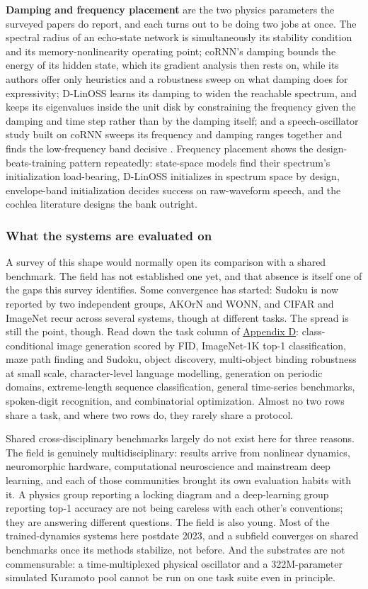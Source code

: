 \documentclass[a4paper,fleqn]{cas-sc}
\begin{document}
\textbf{Damping and frequency placement} are the two physics parameters
the surveyed papers do report, and each turns out to be doing two jobs
at once. The spectral radius of an echo-state network is simultaneously
its stability condition and its memory-nonlinearity operating point;
coRNN's damping bounds the energy of its hidden state, which its
gradient analysis then rests on, while its authors offer only heuristics
and a robustness sweep on what damping does for expressivity; D-LinOSS
learns its damping to widen the reachable spectrum, and keeps its
eigenvalues inside the unit disk by constraining the frequency given the
damping and time step rather than by the damping itself; and a
speech-oscillator study built on coRNN sweeps its frequency and damping
ranges together and finds the low-frequency band decisive
\citep{chandravadia2026}. Frequency placement shows the
design-beats-training pattern repeatedly: state-space models find their
spectrum's initialization load-bearing, D-LinOSS initializes in spectrum
space by design, envelope-band initialization decides success on
raw-waveform speech, and the cochlea literature designs the bank
outright.

\subsubsection{What the systems are evaluated on}\label{sec-2-3-2}

A survey of this shape would normally open its comparison with a shared
benchmark. The field has not established one yet, and that absence is
itself one of the gaps this survey identifies. Some convergence has
started: Sudoku is now reported by two independent groups, AKOrN and
WONN, and CIFAR and ImageNet recur across several systems, though at
different tasks. The spread is still the point, though. Read down the
task column of \hyperref[sec-D]{Appendix D}: class-conditional image
generation scored by FID, ImageNet-1K top-1 classification, maze path
finding and Sudoku, object discovery, multi-object binding robustness at
small scale, character-level language modelling, generation on periodic
domains, extreme-length sequence classification, general time-series
benchmarks, spoken-digit recognition, and combinatorial optimization.
Almost no two rows share a task, and where two rows do, they rarely
share a protocol.

Shared cross-disciplinary benchmarks largely do not exist here for three
reasons. The field is genuinely multidisciplinary: results arrive from
nonlinear dynamics, neuromorphic hardware, computational neuroscience
and mainstream deep learning, and each of those communities brought its
own evaluation habits with it. A physics group reporting a locking
diagram and a deep-learning group reporting top-1 accuracy are not being
careless with each other's conventions; they are answering different
questions. The field is also young. Most of the trained-dynamics systems
here postdate 2023, and a subfield converges on shared benchmarks once
its methods stabilize, not before. And the substrates are not
commensurable: a time-multiplexed physical oscillator and a
322M-parameter simulated Kuramoto pool cannot be run on one task suite
even in principle.
\end{document}

